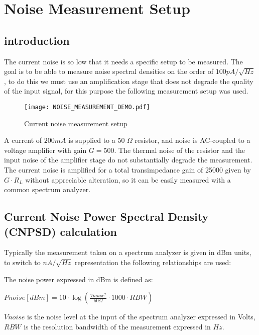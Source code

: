 \newpage
\vspace{5mm}
\section{\QubeModel  Noise Measurement Setup}
\subsection{introduction}
The \QubeModel  current noise is so low that it needs a specific setup to be measured.
The goal is to be able to measure noise spectral densities on the order of $100 pA/\sqrt{Hz}$, to do this we must use an amplification stage that does not degrade the quality of the input signal, for this purpose the following measurement setup was used.


\begin{figure}[H]
\centering
\texttt{[image: NOISE\_MEASUREMENT\_DEMO.pdf]}
\caption{Current noise measurement setup}
\end{figure}

A current of $200 mA$ is supplied to a 50 $\Omega$ resistor, and noise is AC-coupled to a voltage amplifier with gain $G=500$.
The thermal noise of the resistor and the input noise of the amplifier stage do not substantially degrade the measurement.
The current noise is amplified for a total transimpedance gain of 25000 given by $G \cdot R_{L}$ without appreciable alteration, so it can be easily measured with a common spectrum analyzer.

\subsection{Current Noise Power Spectral Density (CNPSD) calculation}

Typically the measurement taken on a spectrum analyzer is given in dBm units, to switch to $nA/\sqrt{Hz}$ representation the following relationships are used:
\newline

The noise power expressed in dBm is defined as:
\newline

$Pnoise [dBm] = 10 \cdot \log (\frac{Vnoise^2}{50 \Omega} \cdot 1000 \cdot RBW)$
\newline

$Vnoise$ is the noise level at the input of the spectrum analyzer expressed in Volts,
$RBW$ is the resolution bandwidth of the measurement expressed in $Hz$.
\newline

